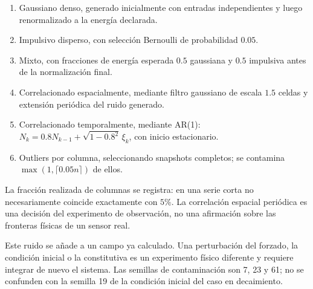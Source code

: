 \documentclass[11pt,oneside,openany]{book}
\begin{document}
\begin{enumerate}
\item Gaussiano denso, generado inicialmente con entradas independientes y
      luego renormalizado a la energía declarada.
\item Impulsivo disperso, con selección Bernoulli de probabilidad $0.05$.
\item Mixto, con fracciones de energía esperada $0.5$ gaussiana y $0.5$
      impulsiva antes de la normalización final.
\item Correlacionado espacialmente, mediante filtro gaussiano de escala
      $1.5$ celdas y extensión periódica del ruido generado.
\item Correlacionado temporalmente, mediante AR(1):
      $N_k=0.8N_{k-1}+\sqrt{1-0.8^2}\,\xi_k$, con inicio estacionario.
\item Outliers por columna, seleccionando snapshots completos;
      se contamina $\max(1,\lceil0.05n\rceil)$ de ellos.
\end{enumerate}
La fracción realizada de columnas se registra: en una serie corta no
necesariamente coincide exactamente con $5\%$. La correlación espacial
periódica es una decisión del experimento de observación, no una afirmación
sobre las fronteras físicas de un sensor real.

Este ruido se añade a un campo ya calculado. Una perturbación del forzado,
la condición inicial o la constitutiva es un experimento físico diferente
y requiere integrar de nuevo el sistema. Las semillas de contaminación
son 7, 23 y 61; no se confunden con la semilla 19 de la condición inicial
del caso en decaimiento.
\end{document}
